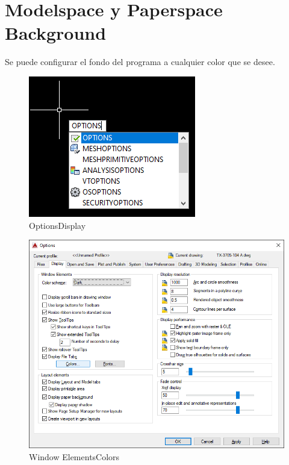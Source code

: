 \documentclass[12pt,letterpaper,final]{report}
\begin{document}
\chapter{Modelspace y Paperspace Background}

Se puede configurar el fondo del programa a cualquier color que se desee.

\begin{figure}[H]
	\centering
	\includegraphics[width=0.75\linewidth, height=0.5\textheight,keepaspectratio]{Imagenes/autocad_background_01}
	\caption{Options\textrightarrow Display}
	\label{fig:autocadbackground01}
\end{figure}

\begin{figure}[H]
	\centering
	\includegraphics[width=0.65\linewidth, height=0.45\textheight,keepaspectratio]{Imagenes/autocad_background_02}
	\caption{Window Elements\textrightarrow Colors}
	\label{fig:autocadbackground02}
\end{figure}
\end{document}
